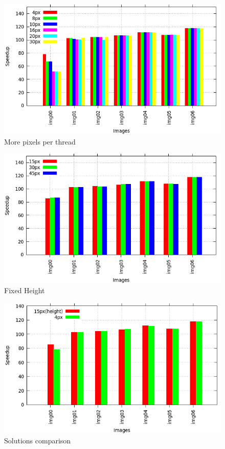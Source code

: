 \documentclass[a4paper]{article}
\begin{document}
\begin{figure}[ht]
    \centering
    \includegraphics[width=0.7\linewidth]{res/new/smooth_more}
    \caption{More pixels per thread}
    \label{fig:smmo}
\end{figure}
\FloatBarrier

\begin{figure}[ht]
    \centering
    \includegraphics[width=0.7\linewidth]{res/new/smooth_fixed_more}
    \caption{Fixed Height}
    \label{fig:smhf}
\end{figure}
\FloatBarrier

\begin{figure}[ht]
    \centering
    \includegraphics[width=0.7\linewidth]{res/new/smooth_compare}
    \caption{Solutions comparison}
    \label{fig:smco}
\end{figure}
\FloatBarrier
\end{document}
